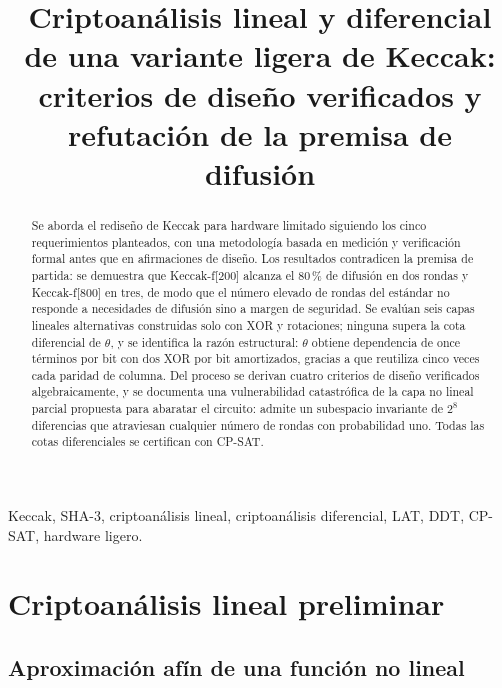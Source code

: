 \documentclass[conference]{IEEEtran}
\begin{document}
\title{Criptoanálisis lineal y diferencial de una variante ligera de Keccak:\\
criterios de diseño verificados y refutación de la premisa de difusión}

\author{
}

\maketitle

\begin{abstract}
Se aborda el rediseño de Keccak para hardware limitado siguiendo los cinco
requerimientos planteados, con una metodología basada en medición y verificación
formal antes que en afirmaciones de diseño. Los resultados contradicen la premisa
de partida: se demuestra que Keccak-f[200] alcanza el 80\,\% de difusión en dos
rondas y Keccak-f[800] en tres, de modo que el número elevado de rondas del
estándar no responde a necesidades de difusión sino a margen de seguridad. Se
evalúan seis capas lineales alternativas construidas solo con XOR y rotaciones;
ninguna supera la cota diferencial de $\theta$, y se identifica la razón
estructural: $\theta$ obtiene dependencia de once términos por bit con dos XOR
por bit amortizados, gracias a que reutiliza cinco veces cada paridad de columna.
Del proceso se derivan cuatro criterios de diseño verificados algebraicamente, y
se documenta una vulnerabilidad catastrófica de la capa no lineal parcial
propuesta para abaratar el circuito: admite un subespacio invariante de $2^{8}$
diferencias que atraviesan cualquier número de rondas con probabilidad uno. Todas
las cotas diferenciales se certifican con CP-SAT.
\end{abstract}

\begin{IEEEkeywords}
Keccak, SHA-3, criptoanálisis lineal, criptoanálisis diferencial, LAT, DDT,
CP-SAT, hardware ligero.
\end{IEEEkeywords}

\section{Criptoanálisis lineal preliminar}

\subsection{Aproximación afín de una función no lineal}
\end{document}
